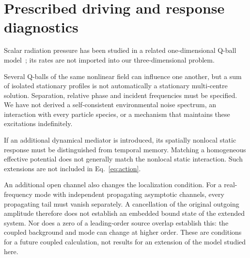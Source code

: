 \section{Prescribed driving and response diagnostics}\label{app:driving}





\clearpage




Scalar radiation pressure has been studied in a related
one-dimensional Q-ball model~\cite{Ciurla2024}; its rates are not imported
into our three-dimensional problem.

Several Q-balls of the same nonlinear field can influence one another,
but a sum of isolated stationary profiles is not automatically a stationary
multi-centre solution. Separation, relative phase and incident frequencies
must be specified. We have not derived a self-consistent environmental
noise spectrum, an interaction with every particle species, or a mechanism
that maintains these excitations indefinitely.

If an additional dynamical mediator is introduced, its spatially nonlocal
static response must be distinguished from temporal memory. Matching a
homogeneous effective potential does not generally match the nonlocal static
interaction. Such extensions are not included in Eq.~\eqref{eq:action}.

An additional open channel also changes the localization condition. For a
real-frequency mode with independent propagating asymptotic channels, every
propagating tail must vanish separately. A cancellation of the original
outgoing amplitude therefore does not establish an embedded bound state of
the extended system. Nor does a zero of a leading-order source overlap
establish this: the coupled background and mode can change at higher order.
These are conditions for a future coupled calculation, not results for an
extension of the model studied here.
